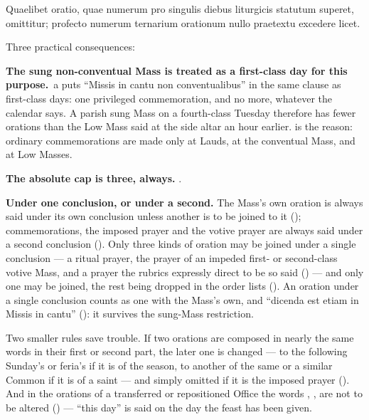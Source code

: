 \begin{rulebox}{}
Quaelibet oratio, quae numerum pro singulis diebus liturgicis statutum superet,
omittitur; profecto numerum ternarium orationum nullo praetextu excedere
licet.
\end{rulebox}

Three practical consequences:

\begin{substeps}
\item \textbf{The sung non-conventual Mass is treated as a first-class day for
this purpose.} \,a puts ``Missis in cantu non conventualibus'' in the
same clause as first-class days: one privileged commemoration, and no more,
whatever the calendar says. A parish sung Mass on a fourth-class Tuesday
therefore has fewer orations than the Low Mass said at the side altar an hour
earlier.  is the reason: ordinary commemorations are made only at
Lauds, at the conventual Mass, and at Low Masses.

\item \textbf{The absolute cap is three, always.} .

\item \textbf{Under one conclusion, or under a second.} The Mass's own oration
is always said under its own conclusion unless another is to be joined to it
(); commemorations, the imposed prayer and the votive prayer are
always said under a second conclusion (). Only three kinds of oration
may be joined under a single conclusion --- a ritual prayer, the prayer of an
impeded first- or second-class votive Mass, and a prayer the rubrics expressly
direct to be so said () --- and only one may be joined, the rest being
dropped in the order  lists (). An oration under a single
conclusion counts as one with the Mass's own, and ``dicenda est etiam in Missis
in cantu'' (): it survives the sung-Mass restriction.
\end{substeps}

Two smaller rules save trouble. If two orations are composed in nearly the same
words in their first or second part, the later one is changed --- to the
following Sunday's or feria's if it is of the season, to another of the same
or a similar Common if it is of a saint --- and simply omitted if it is the
imposed prayer (). And in the orations of a transferred or
repositioned Office the words , ,
 are not to be altered () --- ``this day'' is
said on the day the feast has been given.

